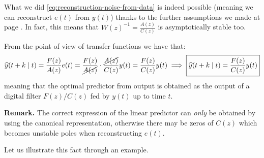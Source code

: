 
What we did \eqref{eq:reconstruction-noise-from-data} is indeed possible (meaning we can reconstruct $e(t)$ from $y(t)$) thanks to the further assumptions we made at page \pageref{assumptions-prediction-theory}. In fact, this means that $W(z)^{-1}=\frac{A(z)}{C(z)}$ is asymptotically stable too.

From the point of view of transfer functions we have that:
\[
	\hat y (t+k\mid t) = \frac{F(z)}{A(z)}e(t) =\frac{F(z)}{\cancel{A(z)}}\cdot\frac{\cancel{A(z)}}{C(z)}y(t) =\frac{F(z)}{C(z)}y(t) \implies \boxed{\hat y (t+k\mid t) = \frac{F(z)}{C(z)}y(t)}
\]
meaning that the optimal predictor from output is obtained as the output of a digital filter $F(z)/C(z)$ fed by $y(t)$ up to time $t$.

\textbf{Remark.}
The correct expression of the linear predictor can \emph{only} be obtained by using the canonical representation, otherwise there may be zeros of $C(z)$ which becomes unstable poles when reconstructing $e(t)$.

Let us illustrate this fact through an example.

